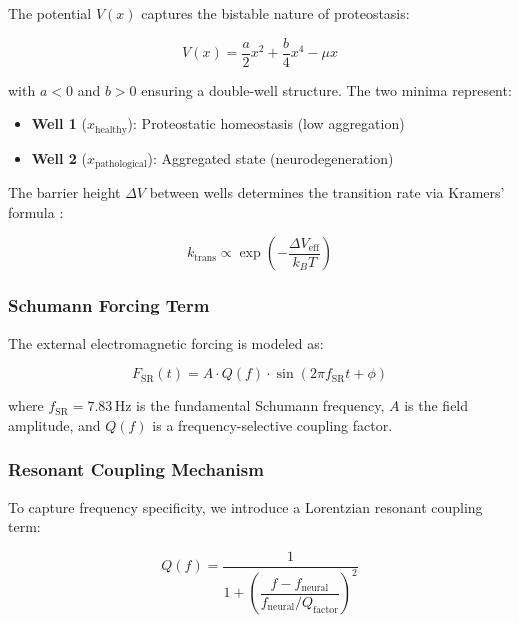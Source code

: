 \documentclass[10pt,a4paper]{article}
\begin{document}
The potential $V(x)$ captures the bistable nature of proteostasis:

\begin{equation}
    V(x) = \frac{a}{2}x^2 + \frac{b}{4}x^4 - \mu x
    \label{eq:potential}
\end{equation}

with $a < 0$ and $b > 0$ ensuring a double-well structure. The two minima represent:
\begin{itemize}
    \item \textbf{Well 1} ($x_{\text{healthy}}$): Proteostatic homeostasis (low aggregation)
    \item \textbf{Well 2} ($x_{\text{pathological}}$): Aggregated state (neurodegeneration)
\end{itemize}

The barrier height $\Delta V$ between wells determines the transition rate via Kramers' 
formula \citep{kramers1940brownian, hanggi1990reaction}:

\begin{equation}
    k_{\text{trans}} \propto \exp\left(-\frac{\Delta V_{\text{eff}}}{k_B T}\right)
    \label{eq:kramers}
\end{equation}

\subsubsection{Schumann Forcing Term}

The external electromagnetic forcing is modeled as:

\begin{equation}
    F_{\text{SR}}(t) = A \cdot Q(f) \cdot \sin(2\pi f_{\text{SR}} t + \phi)
    \label{eq:schumann}
\end{equation}

where $f_{\text{SR}} = 7.83$\,Hz is the fundamental Schumann frequency, $A$ is the field 
amplitude, and $Q(f)$ is a frequency-selective coupling factor.

\subsubsection{Resonant Coupling Mechanism}

To capture frequency specificity, we introduce a Lorentzian resonant coupling term:

\begin{equation}
    Q(f) = \frac{1}{1 + \left(\dfrac{f - f_{\text{neural}}}{f_{\text{neural}}/Q_{\text{factor}}}\right)^2}
    \label{eq:resonance}
\end{equation}
\end{document}
